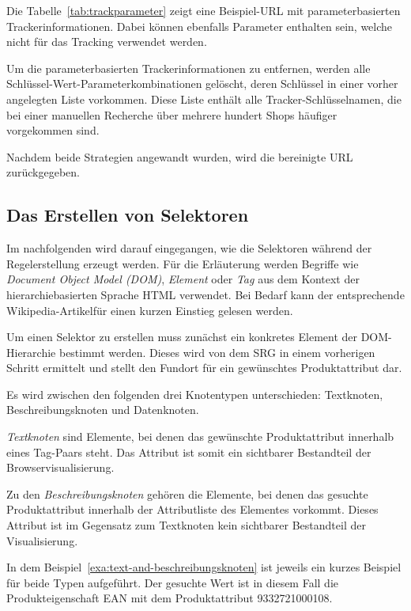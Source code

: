 Die Tabelle~\ref{tab:trackparameter} zeigt eine Beispiel-URL mit parameterbasierten Trackerinformationen.
Dabei können ebenfalls Parameter enthalten sein, welche nicht für das Tracking verwendet werden.

Um die parameterbasierten Trackerinformationen zu entfernen, werden alle Schlüssel-Wert-Parameterkombinationen
gelöscht, deren Schlüssel in einer vorher angelegten Liste vorkommen.
Diese Liste enthält alle Tracker-Schlüsselnamen, die bei einer manuellen Recherche über mehrere hundert Shops
häufiger vorgekommen sind.

Nachdem beide Strategien angewandt wurden, wird die bereinigte URL zurückgegeben.

\subsection{Das Erstellen von Selektoren}
\label{subsec:erstellen-von-selektoren}

Im nachfolgenden wird darauf eingegangen, wie die Selektoren während der Regelerstellung erzeugt werden.
Für die Erläuterung werden Begriffe wie \textit{Document Object Model (DOM)}, \textit{Element} oder \textit{Tag} aus
dem Kontext der hierarchiebasierten Sprache HTML verwendet.
Bei Bedarf kann der entsprechende Wikipedia-Artikel\footnotemark für einen kurzen Einstieg gelesen werden.

Um einen Selektor zu erstellen muss zunächst ein konkretes Element der DOM-Hierarchie bestimmt werden.
Dieses wird von dem SRG in einem vorherigen Schritt ermittelt und stellt den Fundort für ein gewünschtes
Produktattribut dar.

Es wird zwischen den folgenden drei Knotentypen unterschieden: Textknoten, Beschreibungsknoten und Datenknoten.

\textit{Textknoten} sind Elemente, bei denen das gewünschte Produktattribut innerhalb eines Tag-Paars steht.
Das Attribut ist somit ein sichtbarer Bestandteil der Browservisualisierung.

Zu den \textit{Beschreibungsknoten} gehören die Elemente, bei denen das gesuchte Produktattribut innerhalb der
Attributliste des Elementes vorkommt.
Dieses Attribut ist im Gegensatz zum Textknoten kein sichtbarer Bestandteil der Visualisierung.

In dem Beispiel~\ref{exa:text-and-beschreibungsknoten} ist jeweils ein kurzes Beispiel für beide Typen aufgeführt.
Der gesuchte Wert ist in diesem Fall die Produkteigenschaft EAN mit dem Produktattribut 9332721000108.

